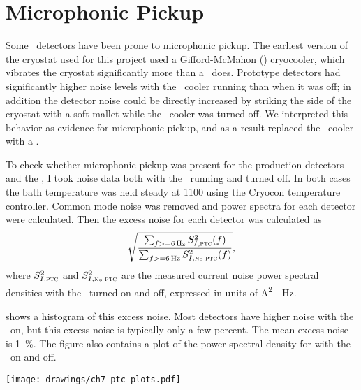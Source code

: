 \section{Microphonic Pickup}


Some \TES\ detectors have been prone to microphonic pickup.
The earliest version of the cryostat used for this project used a Gifford-McMahon (\GM) cryocooler, which vibrates the cryostat significantly more than a \PTC\ does.
Prototype detectors had significantly higher noise levels with the \GM\ cooler running than when it was off; in addition the detector noise could be directly increased by striking the side of the cryostat with a soft mallet while the \GM\ cooler was turned off.
We interpreted this behavior as evidence for microphonic pickup, and as a result replaced the \GM\ cooler with a \PTC.

To check whether microphonic pickup was present for the production detectors and the \PTC, I took noise data both with the \PTC\ running and turned off.
In both cases the bath temperature was held steady at \SI{1100}{\mK} using the Cryocon temperature controller.
Common mode noise was removed and power spectra for each detector were calculated.
Then the excess noise for each detector was calculated as
\begin{equation}
  \sqrt{  \frac{ \sum_{f >= \SI{6}{\Hz}} S^2_{I,\textsc{ptc}}(f) }
               { \sum_{f >= \SI{6}{\Hz}} S^2_{I,\mbox{\tiny{No}}\textsc{ ptc}}(f) }},
\end{equation}
where $S^2_{I,\textsc{ptc}}$ and $S^2_{I,\mbox{\tiny{No}}\textsc{ ptc}}$ are the measured current noise power spectral densities with the \PTC\ turned on and off, expressed in units of \si{\A^2 \per \Hz}.

 shows a histogram of this excess noise. Most detectors have higher noise with the \PTC\ on, but this excess noise is typically only a few percent. 
The mean excess noise is \SI{1}{\percent}.
The figure also contains a plot of the power spectral density for  with the \PTC\ on and off.

\begin{figure*}
  \centering
\texttt{[image: drawings/ch7-ptc-plots.pdf]}
\caption{%
\textbf{Top}
Histogram showing excess noise due to the \PTC, defined as ratio of total noise above \SI{6}{\Hz} (see text for precise definition).
More detectors have higher noise with the \PTC\ on than off, but the mean excess noise is only \SI{1}{\percent}.
\textbf{Bottom}
Current noise for  with \PTC\ on and off, after subtracting common mode noise.
The noise below \SI{30}{\Hz} is 1.5--2.5 times higher with the \PTC\ on, but the total noise at the relevant frequencies of $f >= \SI{6}{\Hz}$ is only \SI{2.9}{\percent}.
}
\label{fig:ch7-ptc-plots}
\end{figure*}

